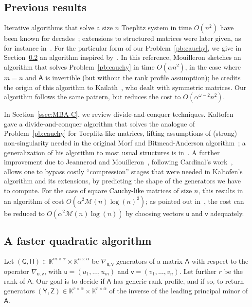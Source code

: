 \documentclass{sig-alternate}
\newcommand{\vu}{\ensuremath{\mathsf{u}}}
\newcommand{\vv}{\ensuremath{\mathsf{v}}}
\newcommand{\mA}{\ensuremath{\mathsf{A}}}
\newcommand{\mG}{\ensuremath{\mathsf{G}}}
\newcommand{\mH}{\ensuremath{\mathsf{H}}}
\newcommand{\mY}{\ensuremath{\mathsf{Y}}}
\newcommand{\mZ}{\ensuremath{\mathsf{Z}}}
\newcommand{\K}{\ensuremath{\mathbb{K}}}
\newcommand{\M}{\ensuremath{\mathscr{M}}}
\begin{document}

\subsection{Previous results}

Iterative algorithms that solve a size $n$ Toeplitz system in time
$O(n^2)$ have been known for
decades~\cite{Levinson47,Durbin60,Trench64}; extensions to
structured matrices were later given, as for instance
in~\cite{KaGoOl95}. For the particular form of our
Problem~\ref{pb:cauchy}, we give in Section~\ref{ssec:quad} an
algorithm inspired by~\cite[Algorithme~4]{Mouilleron08}. In this
reference, Mouilleron sketches an algorithm that solves
Problem~\ref{pb:cauchy} in time $O(\alpha n^2)$, in the case where
$m=n$ and $\mA$ is invertible (but without the rank profile
assumption); he credits the origin of this algorithm to
Kailath~\cite[\S1.10]{KaSa99}, who dealt with symmetric matrices.
Our algorithm follows the same pattern, but reduces the cost to 
$O(\alpha^{\omega-2} n^2)$.

In Section~\ref{ssec:MBA-C}, we review divide-and-conquer
techniques. Kaltofen~\cite{Kaltofen94} gave a divide-and-conquer
algorithm that solves the analogue of Problem~\ref{pb:cauchy} for
Toeplitz-like matrices, lifting assumptions of (strong)
non-singularity needed in the original Morf and Bitmead-Anderson
algorithm~\cite{Morf80,BiAn80}; a generalization of his algorithm to
most usual structures is in~\cite{Pan01}.  A further improvement due
to Jeannerod and Mouilleron~\cite{JeMo10}, following Cardinal's
work~\cite{Cardinal99}, allows one to bypass costly ``compression''
stages that were needed in Kaltofen's algorithm and its extensions, by
predicting the shape of the generators we have to compute. For the
case of square Cauchy-like matrices of size $n$, this results in an
algorithm of cost $O(\alpha^2 \M(n)\log(n)^2)$; as pointed out
in~\cite{xxx}, the cost can be reduced to $O(\alpha^2 \M(n)\log(n))$
by choosing vectors $\vu$ and $\vv$ adequately.



\subsection{A faster quadratic algorithm}\label{ssec:quad}

Let $(\mG,\mH) \in \K^{m\times \alpha} \times \K^{n\times \alpha}$ be
$\nabla_{\vu,\vv}$-generators of a matrix $\mA$ with respect to the
operator $\nabla_{\vu,\vv}$, with $\vu=(u_1,\dots,u_m)$ and
$\vv=(v_1,\dots,v_n)$. Let further $r$ be the rank of $\mA$. Our goal
is to decide if $\mA$ has generic rank profile, and if so, to return
generators $(\mY,\mZ) \in \K^{r\times \alpha} \times \K^{r\times
  \alpha}$ of the inverse of the leading principal minor of $\mA$.
\end{document}
